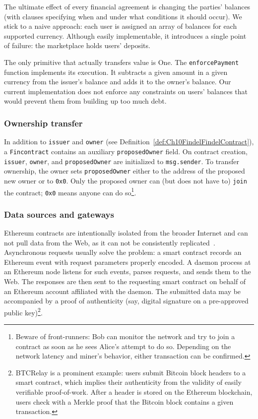 The ultimate effect of every financial agreement is changing the parties' balances (with clauses specifying when and under what conditions it should occur).
We stick to a naive approach: each user is assigned an array of balances for each supported currency.
Although easily implementable, it introduces a single point of failure: the marketplace holds users' deposits.

The only primitive that actually transfers value is \(\mathrm{One}\).
The \texttt{enforcePayment} function implements its execution.
It subtracts a given amount in a given currency from the issuer's balance and adds it to the owner's balance.
Our current implementation does not enforce any constraints on users' balances that would prevent them from building up too much debt.


\subsubsection{Ownership transfer}

In addition to \texttt{issuer} and \texttt{owner} (see Definition~\ref{def:Ch10FindelFindelContract}), a \texttt{Fincontract} contains an auxiliary \texttt{proposedOwner} field.
On contract creation, \texttt{issuer}, \texttt{owner}, and \texttt{proposedOwner} are initialized to \texttt{msg.sender}.
To transfer ownership, the owner sets \texttt{proposedOwner} either to the address of the proposed new owner or to \texttt{0x0}.
Only the proposed owner can (but does not have to) \texttt{join} the contract; \texttt{0x0} means anyone can do so\footnote{Beware of front-runners: Bob can monitor the network and try to join a contract as soon as he sees Alice's attempt to do so. Depending on the network latency and miner's behavior, either transaction can be confirmed.}.


\subsubsection{Data sources and gateways} \label{def:Ch10FindelGateways}

Ethereum contracts are intentionally isolated from the broader Internet and can not pull data from the Web, as it can not be consistently replicated~\cite{Greenspan2016}.
Asynchronous requests usually solve the problem: a smart contract records an Ethereum event with request parameters properly encoded.
A daemon process at an Ethereum node listens for such events, parses requests, and sends them to the Web.
The responses are then sent to the requesting smart contract on behalf of an Ethereum account affiliated with the daemon.
The submitted data may be accompanied by a proof of authenticity (say, digital signature on a pre-approved public key)\footnote{BTCRelay is a prominent example: users submit Bitcoin block headers to a smart contract, which implies their authenticity from the validity of easily verifiable proof-of-work. After a header is stored on the Ethereum blockchain, users check with a Merkle proof that the Bitcoin block contains a given transaction.}.


